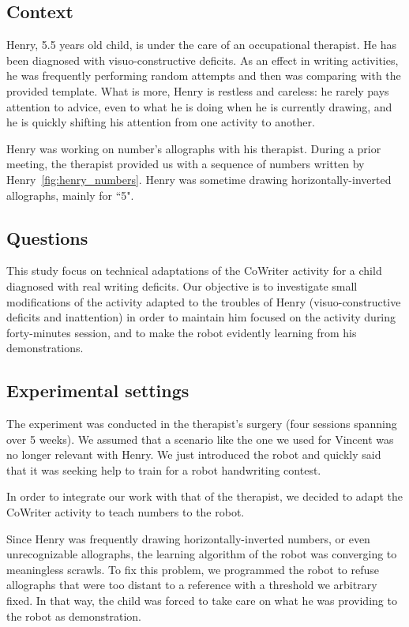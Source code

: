 \documentclass{sig-alternate}
\begin{document}
\subsection{Context}

Henry, 5.5 years old child, is under the care of an occupational
therapist. He has been diagnosed with visuo-constructive deficits.
As an effect in writing activities, he was frequently performing random attempts and then was comparing
with the provided template. What is more, Henry is restless and careless: he
rarely pays attention to
advice, even to what he is doing when he is currently drawing, and he is
quickly shifting his attention from one activity to another.

Henry was working on number's allographs with his therapist. During a prior
meeting, the therapist provided us with a sequence of numbers
written by Henry~\ref{fig:henry_numbers}. Henry was sometime drawing
horizontally-inverted allographs, mainly for ``5".

\subsection{Questions}
This study focus on technical adaptations of the CoWriter activity for a 
child diagnosed with real writing deficits.
Our objective is to investigate small modifications of the activity adapted to
the troubles of Henry (visuo-constructive deficits and inattention) in order to
maintain him focused
on the activity during forty-minutes session, and to make the robot
evidently learning from his demonstrations.

\subsection{Experimental settings}
The experiment was conducted in the therapist's surgery  (four sessions 
spanning over 5 weeks). We assumed that a scenario like the one we used 
for Vincent was no longer relevant with Henry. We just introduced the robot 
and quickly said that it was seeking help to train for a robot handwriting contest.

In order to integrate our work with that of the therapist, we decided to adapt the 
CoWriter activity to teach numbers to the robot.

Since Henry was frequently drawing horizontally-inverted numbers, or even
unrecognizable allographs, the learning algorithm of the robot was converging to
meaningless scrawls. To fix this problem, we programmed the robot to refuse allographs that
were too distant to a reference with a threshold we arbitrary fixed. In that way,
the child was forced to take care on what he was providing to the robot as
demonstration. 
\end{document}
